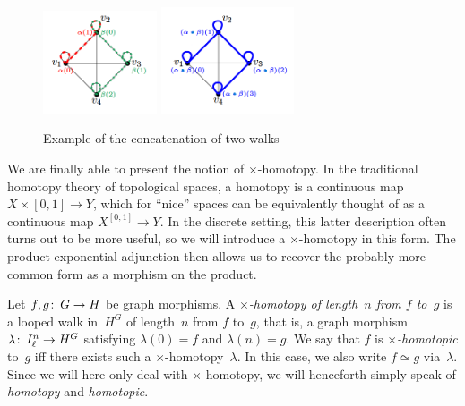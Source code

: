 \documentclass[11pt,a4paper]{article}
\begin{document}
		\begin{figure}[H]
			\centering
			\includegraphics[width=0.3\textwidth]{figures/concatenation-input}
			\includegraphics[width=0.35\textwidth]{figures/concatenation-output-bearbeitet}
			\caption{Example of the concatenation of two walks}
			\label{fig:concatenation}
		\end{figure}

	We are finally able to present the notion of $\times$-homotopy.	In the traditional homotopy theory of topological spaces, a homotopy is a continuous map $X\times[0,1]\to Y$, which for ``nice'' spaces can be equivalently thought of as a continuous map $X^{[0,1]}\to Y$. In the discrete setting, this latter description often turns out to be more useful, so we will introduce a $\times$-homotopy in this form. The product-exponential adjunction then allows us to recover the probably more common form as a morphism on the product.
	
	\begin{defi}
		Let $f,g\colon\thinspace G\to H$ be graph morphisms.
		A \textit{$\times$-homotopy of length~$n$ from $f$ to~$g$} is a looped walk in~$H^G$ of length~$n$ from $f$ to~$g$, that is, a graph morphism $\lambda\colon\thinspace I^n_\ell\to H^G$ satisfying $\lambda(0)=f$ and $\lambda(n)=g$.
		We say that $f$ is \textit{$\times$-homotopic} to~$g$ iff there exists such a $\times$-homotopy~$\lambda$.
		In this case, we also write $f\simeq g$ via~$\lambda$.
		Since we will here only deal with $\times$-homotopy, we will henceforth simply speak of \textit{homotopy} and \textit{homotopic}.
	\end{defi}
\end{document}
